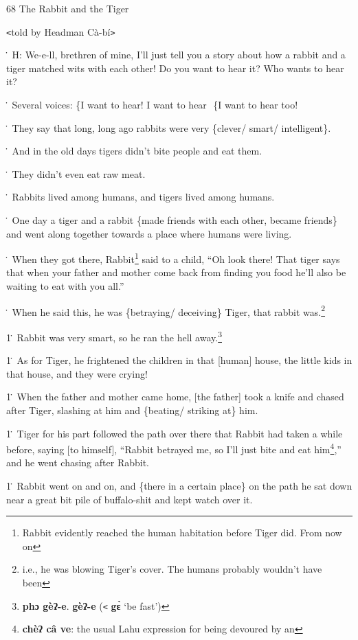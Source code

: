 
68 The Rabbit and the Tiger

\texttt{<}told by Headman Cà-bí\texttt{>}

\. H: We-e-ll, brethren of mine, I'll just tell you a story about how a rabbit
and a tiger matched wits with each other! Do you want to hear it? Who wants to
hear it?

\. Several voices: \{I want to hear! I want to hear          \{I want to hear
too!

\. They say that long, long ago rabbits were very \{clever/ smart/ intelligent\}.

\. And in the old days tigers didn't bite people and eat them.

\. They didn't even eat raw meat.

\. Rabbits lived among humans, and tigers lived among humans.

\. One day a tiger and a rabbit \{made friends with each other, became friends\}
and went along together towards a place where humans were living.

\. When they got there, Rabbit\footnote{Rabbit evidently reached the human habitation before Tiger did. From now on} said to a child, ``Oh look there! That tiger
says that when your father and mother come back from finding you food he'll also
be waiting to eat with you all.''

\. When he said this, he was \{betraying/ deceiving\} Tiger, that rabbit was.\footnote{i.e., he was blowing Tiger's cover. The humans probably wouldn't have been}

1\. Rabbit was very smart, so he ran the hell away.\footnote{\textbf{ phɔ  gèʔ-e}. \textbf{gèʔ-e }(\texttt{<} \textbf{gɛ̀} `be fast')}

1\. As for Tiger, he frightened the children in that [human] house, the little
kids in that house, and they were crying!

1\. When the father and mother came home, [the father] took a knife and chased
after Tiger, slashing at him and \{beating/ striking at\} him.

1\. Tiger for his part followed the path over there that Rabbit had taken a while
before, saying [to himself], ``Rabbit betrayed me, so I'll just bite and eat him\footnote{\textbf{chèʔ câ ve}: the usual Lahu expression for being devoured by an},''
and he went chasing after Rabbit.

1\. Rabbit went on and on, and \{there in a certain place\} on the path he sat
down near a great bit pile of buffalo-shit and kept watch over it.

